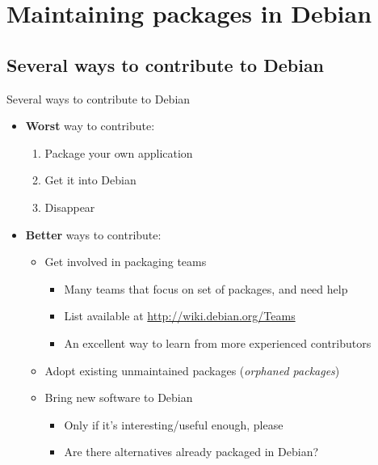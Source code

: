 \documentclass[10pt,final]{beamer}
\begin{document}
\section{Maintaining packages in Debian}
\subsection{Several ways to contribute to Debian}
\begin{frame}{Several ways to contribute to Debian}
  \begin{itemize}
  \item \textbf{Worst} way to contribute:
    \begin{enumerate}
    \item Package your own application
    \item Get it into Debian
    \item Disappear
    \end{enumerate}
    \br
  \item \textbf{Better} ways to contribute:
	  \begin{itemize}
		  \item Get involved in packaging teams
    \begin{itemize}
    \item Many teams that focus on set of packages, and need help
    \item List available at \url{http://wiki.debian.org/Teams}
    \item An excellent way to learn from more experienced contributors
    \end{itemize}
    \br
\item Adopt existing unmaintained packages (\textsl{orphaned packages})
    \br
  \item Bring new software to Debian
    \begin{itemize}
    \item Only if it's interesting/useful enough, please
    \item Are there alternatives already packaged in Debian?
    \end{itemize}
  \end{itemize}

  \end{itemize}
\end{frame}
\end{document}
